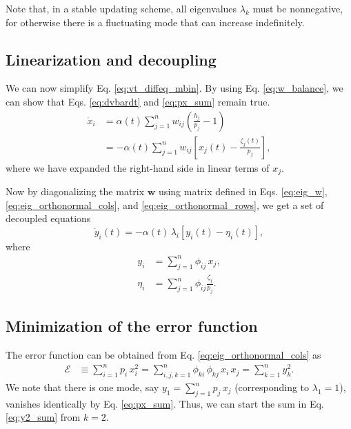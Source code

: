 \documentclass[reprint]{revtex4-1}
\begin{document}
Note that, in a stable updating scheme,
all eigenvalues $\lambda_k$ must be nonnegative,
for otherwise there is a fluctuating mode
that can increase indefinitely.



\subsection{Linearization and decoupling}



We can now simplify Eq. \eqref{eq:vt_diffeq_mbin}.
%
By using Eq. \eqref{eq:w_balance},
we can show that
Eqs. \eqref{eq:dvbardt} and \eqref{eq:px_sum}
remain true.
%
%
$$
\begin{aligned}
\dot x_i
&= \alpha(t) \sum_{j=1}^n w_{ij}
\left( \frac{ h_j } { p_j }  - 1 \right)
\\
&=
-\alpha(t) \sum_{j = 1}^n
w_{ij} \left[ x_j(t) - \frac{\zeta_j (t)}{p_j} \right],
\end{aligned}
$$
where
we have expanded the right-hand side
in linear terms of $x_j$.


Now by diagonalizing the matrix $\mathbf w$
using matrix defined in Eqs. \eqref{eq:eig_w},
\eqref{eq:eig_orthonormal_cols},
and
\eqref{eq:eig_orthonormal_rows},
we get a set of decoupled equations
%
\begin{equation}
\dot y_i(t)
=
-\alpha(t) \, \lambda_i
[y_i(t) - \eta_i(t)],
\label{eq:yt_diffeq}
\end{equation}
%
where
\begin{align}
  y_i &= \sum_{j=1}^n \phi_{ij} \, x_j,
  \label{eq:y_def}
  \\
  \eta_i &= \sum_{j=1}^n \phi_{ij} \frac{ \zeta_j}{ p_j}.
  \label{eq:eta_def}
\end{align}



\subsection{Minimization of the error function}



The error function can be obtained
from Eq. \eqref{eq:eig_orthonormal_cols}
as
\begin{align}
  \mathcal E
  &\equiv
  \sum_{i = 1}^n p_i \, x_i^2
  =
  \sum_{i, j, k=1}^n \phi_{ki} \, \phi_{kj} \, x_i \, x_j
  =
  \sum_{k = 1}^n y_k^2.
  \label{eq:y2_sum}
\end{align}
%
We note that there is one mode, say
$y_1 = \sum_{j=1}^n p_j \, x_j$
(corresponding to $\lambda_1 = 1$),
vanishes identically by Eq. \eqref{eq:px_sum}.
%
Thus, we can start the sum in Eq. \eqref{eq:y2_sum}
from $k = 2$.
\end{document}
